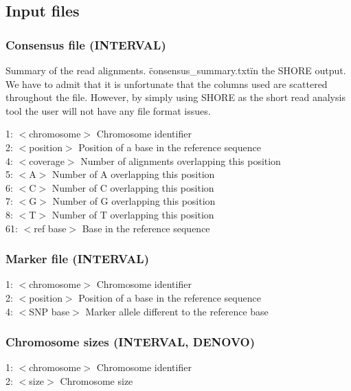 \documentclass[a4paper,10pt]{scrartcl}
\begin{document}
\subsection{Input files}

\subsubsection{Consensus file (INTERVAL)}

Summary of the read alignments. \"consensus\_summary.txt\" in the SHORE output. We have to admit that it is unfortunate that the columns used are scattered throughout the file. However, by simply using SHORE as the short read analysis tool the user will not have any file format issues.

1: $<$chromosome$>$ Chromosome identifier\\
2: $<$position$>$ Position of a base in the reference sequence\\
4: $<$coverage$>$ Number of alignments overlapping this position\\
5: $<$A$>$ Number of A overlapping this position\\
6: $<$C$>$ Number of C overlapping this position\\
7: $<$G$>$ Number of G overlapping this position\\
8: $<$T$>$ Number of T overlapping this position\\
61: $<$ref base$>$ Base in the reference sequence\\

\subsubsection{Marker file (INTERVAL)}

1: $<$chromosome$>$ Chromosome identifier\\
2: $<$position$>$ Position of a base in the reference sequence\\
4: $<$SNP base$>$ Marker allele different to the reference base\\

\subsubsection{Chromosome sizes (INTERVAL, DENOVO)}

1: $<$chromosome$>$ Chromosome identifier\\
2: $<$size$>$ Chromosome size\\
\end{document}
